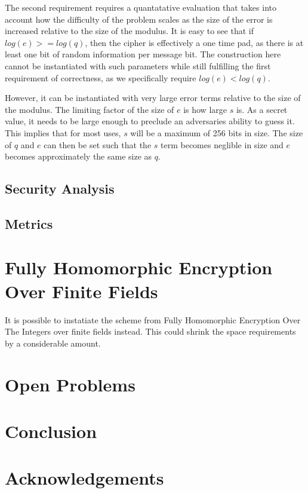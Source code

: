 \documentclass[preprint]{iacrtrans}
\begin{document}
The second requirement requires a quantatative evaluation that takes into account how the difficulty of the problem scales as the size of the error is increased relative to the size of the modulus. It is easy to see that if $log(e) >= log(q)$, then the cipher is effectively a one time pad, as there is at least one bit of random information per message bit. The construction here cannot be instantiated with such parameters while still fulfilling the first requirement of correctness, as we specifically require $log(e) < log(q)$. 

However, it can be instantiated with very large error terms relative to the size of the modulus. The limiting factor of the size of $e$ is how large $s$ is. As a secret value, it needs to be large enough to preclude an adversaries ability to guess it. This implies that for most uses, $s$ will be a maximum of 256 bits in size. The size of $q$ and $e$ can then be set such that the $s$ term becomes neglible in size and $e$ becomes approximately the same size as $q$.

\subsection{Security Analysis}

\subsection{Metrics}

\section{Fully Homomorphic Encryption Over Finite Fields}
It is possible to instatiate the scheme from Fully Homomorphic Encryption Over The Integers over finite fields instead. This could shrink the space requirements by a considerable amount.

\section{Open Problems}

\section{Conclusion}


\section*{Acknowledgements}
\end{document}
